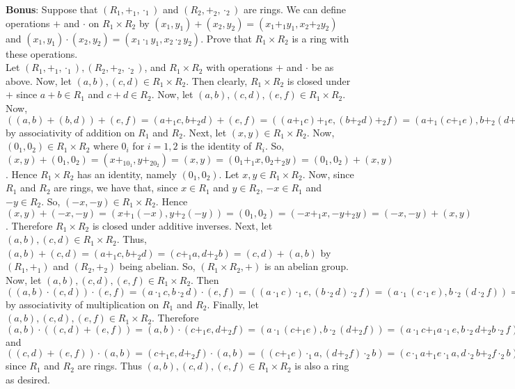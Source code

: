 \documentclass[12pt]{article}
\begin{document}
\textbf{Bonus}: Suppose that $(R_1,+_1,\cdot_1)$ and $(R_2,+_2,\cdot_2)$ are rings. We can define operations $+$ and $\cdot$ on $R_1\times R_2$ by $(x_1,y_1)+(x_2,y_2)=(x_1+_1y_1,x_2+_2y_2)$ and $(x_1,y_1)\cdot(x_2,y_2)=(x_1\cdot_1y_1,x_2\cdot_2y_2)$. Prove that $R_1\times R_2$ is a ring with these operations.\\
Let $(R_1,+_1,\cdot_1), (R_2,+_2,\cdot_2)$, and $R_1\times R_2$ with operations $+$ and $\cdot$ be as above. Now, let $(a,b),(c,d)\in R_1\times R_2$. Then clearly, $R_1\times R_2$ is closed under $+$ since $a+b\in R_1$ and $c+d\in R_2$. Now, let $(a,b),(c,d),(e,f)\in R_1\times R_2$. Now, $((a,b)+(b,d))+(e,f)=(a+_1c,b+_2d)+(e,f)=((a+_1c)+_1e,(b+_2d)+_2f)=(a+_1(c+_1e),b+_2(d+_2f))=(a,b)+(c+_1e,d+_2f)=(a,b)+((c,d)+(e,f))$ by associativity of addition on $R_1$ and $R_2$. Next, let $(x,y)\in R_1\times R_2$. Now, $(0_1,0_2)\in R_1\times R_2$ where $0_i$ for $i=1,2$ is the identity of $R_i$. So, $(x,y)+(0_1,0_2)=(x+_10_1,y+_20_2)=(x,y)=(0_1+_1x,0_2+_2y)=(0_1,0_2)+(x,y)$. Hence $R_1\times R_2$ has an identity, namely $(0_1,0_2)$. Let $x,y\in R_1\times R_2$. Now, since $R_1$ and $R_2$ are rings, we have that, since $x\in R_1$ and $y\in R_2$, $-x\in R_1$ and $-y\in R_2$. So, $(-x,-y)\in R_1\times R_2$. Hence $(x,y)+(-x,-y)=(x+_1(-x),y+_2(-y))=(0_1,0_2)=(-x+_1x,-y+_2y)=(-x,-y)+(x,y)$. Therefore $R_1\times R_2$ is closed under additive inverses. Next, let $(a,b),(c,d)\in R_1\times R_2$. Thus, $(a,b)+(c,d)=(a+_1c,b+_2d)=(c+_1a,d+_2b)=(c,d)+(a,b)$ by $(R_1,+_1)$ and $(R_2,+_2)$ being abelian. So, $(R_1\times R_2,+)$ is an abelian group. Now, let $(a,b),(c,d),(e,f)\in R_1\times R_2$. Then $((a,b)\cdot(c,d))\cdot(e,f)=(a\cdot_1c,b\cdot_2d)\cdot(e,f)=((a\cdot_1c)\cdot_1e,(b\cdot_2d)\cdot_2f)=(a\cdot_1(c\cdot_1e),b\cdot_2(d\cdot_2f))=(a,b)\cdot(c\cdot_1e,d\cdot_2f)=(a,b)\cdot((c,d)\cdot(e,f))$ by associativity of multiplication on $R_1$ and $R_2$. Finally, let $(a,b),(c,d),(e,f)\in R_1\times R_2$. Therefore $(a,b)\cdot((c,d)+(e,f))=(a,b)\cdot(c+_1e,d+_2f)=(a\cdot_1(c+_1e),b\cdot_2(d+_2f))=(a\cdot_1c+_1a\cdot_1e,b\cdot_2d+_2b\cdot_2f)$ and $((c,d)+(e,f))\cdot(a,b)=(c+_1e,d+_2f)\cdot(a,b)=((c+_1e)\cdot_1a,(d+_2f)\cdot_2b)=(c\cdot_1a+_1e\cdot_1a,d\cdot_2b+_2f\cdot_2b)$ since $R_1$ and $R_2$ are rings. Thus $(a,b),(c,d),(e,f)\in R_1\times R_2$ is also a ring as desired.
\end{document}
